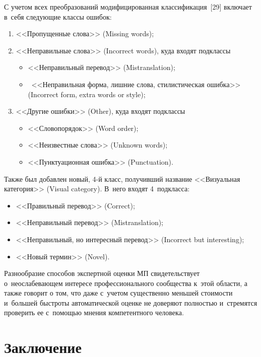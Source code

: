 \begin{multicols}{2}
  С учетом всех преобразований модифицированная классификация~[29] 
включает в~себя следующие классы ошибок: 
\begin{enumerate}[(1)]
\item <<Пропущенные слова>> 
(Missing words); 
\item <<Неправильные слова>> (Incorrect words), куда входят 
подклассы
\begin{itemize}
\item  <<Неправильный перевод>> (Mistranslation);
\item ~<<Неправильная 
форма, лишние слова, стилистическая ошибка>> (Incorrect form, extra words 
or style);
\end{itemize} 
\item <<Другие ошибки>> (Other), куда входят подклассы 
\begin{itemize}
\item <<Словопорядок>> (Word order); 
\item <<Неизвестные слова>> (Unknown words); 
\item <<Пунктуационная ошибка>> (Punctuation).
\end{itemize}
\end{enumerate}
  
  Также был добавлен новый, 4-й класс, получивший название 
<<Визуальная категория>> (Visual category). В~него входят 
4~подкласса: 
\begin{itemize}
\item <<Правильный перевод>> (Correct); 
\item <<Неправильный перевод>> 
(Mistranslation); 
\item <<Неправильный, но интересный перевод>> (Incorrect but 
interesting); 
\item <<Новый термин>> (Novel).
\end{itemize}

  
  Разнообразие способов экспертной оценки МП свидетельствует 
о~неослабевающем интересе профессионального сообщества к~этой области, 
а также говорит о том, что даже с~учетом существенно меньшей стоимости 
и~большей быстроты автоматической оценке не доверяют полностью 
и~стремятся проверить ее с~помощью мнения компетентного человека.
  
  \section{Заключение}
  

\end{multicols}
